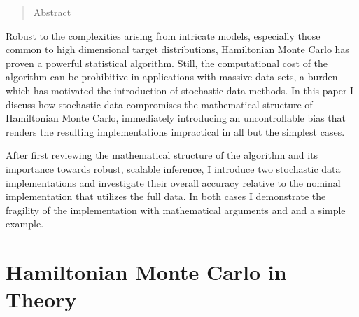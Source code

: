 \documentclass{article}
\begin{document}


\begin{abstract}
Abstract
\end{abstract}

Robust to the complexities arising from intricate models, especially those 
common to high dimensional target distributions, Hamiltonian Monte Carlo 
has proven a powerful statistical algorithm.  Still, the computational 
cost of the algorithm can be prohibitive in applications with massive data sets, 
a burden which has motivated the introduction of stochastic data methods.
In this paper I discuss how stochastic data compromises the mathematical 
structure of Hamiltonian Monte Carlo, immediately introducing an uncontrollable
bias that renders the resulting implementations impractical in all but the simplest 
cases.

After first reviewing the mathematical structure of the algorithm and its importance 
towards robust, scalable inference, I introduce two stochastic data
implementations and investigate their overall accuracy relative to the nominal 
implementation that utilizes the full data.  In both cases I demonstrate the fragility 
of the implementation with mathematical arguments and and a simple example.

\section{Hamiltonian Monte Carlo in Theory}
\end{document}
